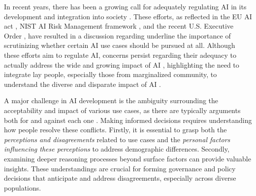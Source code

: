 In recent years, there has been a growing call for adequately regulating AI in its development and integration into society \citep{pistilli2023stronger}. These efforts, as reflected in the EU AI act \citep{AIAct_2023}, NIST AI Risk Management framework \citep{NIST_2021}, and the recent U.S. Executive Order \citep{executiveorder2023}, have resulted in a discussion regarding underline the importance of scrutinizing whether certain AI use cases should be pursued at all. Although these efforts aim to regulate AI, concerns persist regarding their adequacy to actually address the wide and growing impact of AI \citep{dominguez2024mapping}, highlighting the need to integrate lay people, especially those from marginalized community, to understand the diverse and disparate impact of AI \citep{}. 

A major challenge in AI development is the ambiguity surrounding the acceptability and impact of various use cases, as there are typically arguments both for and against each one \citep{mun2024participaidemocraticsurveyingframework}. Making informed decisions requires understanding how people resolve these conflicts. Firstly, it is essential to grasp both the \emph{perceptions and disagreements} related to use cases and the \emph{personal factors influencing these perceptions} to address demographic differences. Secondly, examining deeper reasoning processes beyond surface factors can provide valuable insights. These understandings are crucial for forming governance and policy decisions that anticipate and address disagreements, especially across diverse populations.